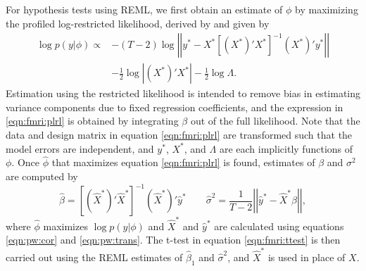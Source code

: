 For hypothesis tests using REML, we first obtain an estimate of $\phi$ by maximizing the profiled log-restricted likelihood, derived by \citet{harville:reml:1977} and given by
\begin{align}
\log p(y|\phi) \propto & -(T-2)\log\left|\left| y^* - X^*\left[(X^*)'X^*\right]^{-1}(X^*)'y^* \right|\right| \label{eqn:fmri:plrl} \\
 & - \frac{1}{2}\log\left|(X^*)'X^*\right| - \frac{1}{2} \log \Lambda. \nonumber
\end{align}
Estimation using the restricted likelihood is intended to remove bias in estimating variance components due to fixed regression coefficients, and the expression in \eqref{eqn:fmri:plrl} is obtained by integrating $\beta$ out of the full likelihood. Note that the data and design matrix in equation \eqref{eqn:fmri:plrl} are transformed such that the model errors are independent, and $y^*$, $X^*$, and $\Lambda$ are each implicitly functions of $\phi$. Once $\hat{\phi}$ that maximizes equation \eqref{eqn:fmri:plrl} is found, estimates of $\beta$ and $\sigma^2$ are computed by
\begin{equation}
\hat{\beta} = \left[(\hat{X}^*)'\hat{X}^*\right]^{-1}(\hat{X}^*)'\hat{y}^* \qquad \hat{\sigma}^2 = \frac{1}{T-2}\left|\left| \hat{y}^*-\hat{X}^*\hat{\beta} \right|\right|, \label{eqn:fmri:reml}
\end{equation}
where $\hat{\phi}$ maximizes $\log p(y|\phi)$ and $\hat{X}^*$ and $\hat{y}^*$ are calculated using equations \eqref{eqn:pw:cor} and \eqref{eqn:pw:trans}. The t-test in equation \eqref{eqn:fmri:ttest} is then carried out using the REML estimates of $\hat{\beta}_1$ and $\hat{\sigma}^2$, and $\hat{X}^*$ is used in place of $X$.


